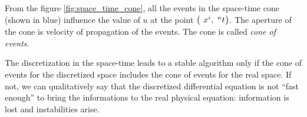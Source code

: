 From the figure \ref{fig:space_time_cone}, all the events in the space-time
cone (shown in blue) influence the value of $u$ at the point
$\left(\Disc{x}{i}{},\Disc{t}{}{n}\right)$. The aperture of the cone
is velocity of propagation of the events. The cone is called
\emph{cone of events}.

The discretization in the space-time leads to a stable algorithm only
if the cone of events for the discretized space includes the cone of events
for the real space. If not, we can qualitatively say that the
discretized differential equation is not ``fast enough'' to bring the
informations to the real physical equation: information is lost and
instabilities arise.




    

